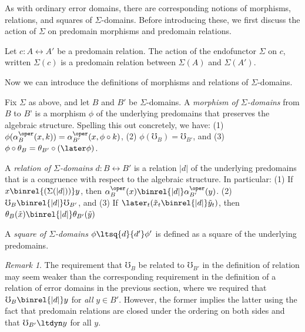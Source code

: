 \documentclass[acmsmall, screen]{acmart}
\theoremstyle{remark}
\newtheorem{remark}{Remark}
\begin{document}
As with ordinary error domains, there are corresponding notions of morphisms,
relations, and squares of $\Sigma$-domains. Before introducing these, we first
discuss the action of $\Sigma$ on predomain morphisms and predomain relations.

Let $c : A \rel A'$ be a predomain relation. The action of the endofunctor
$\Sigma$ on $c$, written $\Sigma(c)$ is a predomain relation between $\Sigma(A)$
and $\Sigma(A')$.



Now we can introduce the definitions of morphisms and relations of
$\Sigma$-domains.
%
\begin{definition}\label{def:sigma-domain-mor-rel-sq}
  Fix $\Sigma$ as above, and let $B$ and $B'$ be $\Sigma$-domains. A
  \emph{morphism of $\Sigma$-domains} from $B$ to $B$' is a morphism $\phi$ of
  the underlying predomains that preserves the algebraic structure.
  Spelling this out concretely, we have:
  (1) $\phi (\alpha^{\oper}_B(x, k)) = \alpha^{\oper}_{B'}(x, \phi \circ k)$,
  (2) $\phi(\mho_B) = \mho_{B'}$, and
  (3) $\phi \circ \theta_B = \theta_{B'} \circ (\later \phi)$.

  A \emph{relation of $\Sigma$-domains} $d : B \rel B'$ is a relation $|d|$ of
  the underlying predomains that is a congruence with respect to the algebraic
  structure. In particular:
  (1) If $x \binrel{(\Sigma(|d|))} y$, then $\alpha^{\oper}_B(x) \binrel{|d|} \alpha^{\oper}_{B'}(y)$.
  (2) $\mho_B \binrel{|d|} \mho_{B'}$, and
  (3) If $\later_t(\tilde{x}_t \binrel{|d|} \tilde{y}_t)$, then
  $\theta_B(\tilde{x}) \binrel{|d|} \theta_{B'}(\tilde{y})$

  A \emph{square of $\Sigma$-domains} $\phi \ltsq{d}{d'} \phi'$ is defined
  as a square of the underlying predomains. 
\end{definition}

\begin{remark}
  The requirement that $\mho_B$ be related to $\mho_{B'}$ in the definition of
  relation may seem weaker than the corresponding requirement in the definition
  of a relation of error domains in the previous section, where we required that
  $\mho_B \binrel{|d|} y$ for \emph{all} $y \in B'$. However, the former implies
  the latter using the fact that predomain relations are closed under the
  ordering on both sides and that $\mho_{B'} \ltdyn y$ for all $y$.
\end{remark}
\end{document}
